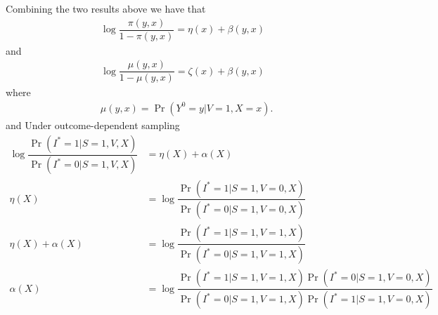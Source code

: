 \begin{appendix}
Combining the two results above we have that
\begin{align*}
    \log \dfrac{\pi(y, x)}{1 - \pi(y, x)} = \eta(x) + \beta(y, x)
\end{align*}
and 
\begin{align*}
    \log \dfrac{\mu(y, x)}{1 - \mu(y, x)} = \zeta(x) + \beta(y, x)
\end{align*}
where
\begin{align*}
    &\mu(y, x) = \Pr(Y^0 = y | V = 1, X = x). 
\end{align*}
and
Under outcome-dependent sampling 
\begin{align*}
    \log \dfrac{\Pr(I^* = 1 | S = 1, V, X)}{\Pr(I^* = 0 | S = 1, V, X)} &= \eta(X) + \alpha (X) \\
    \eta(X) &= \log \dfrac{\Pr(I^* = 1 | S = 1, V=0, X)}{\Pr(I^* = 0 | S = 1, V=0, X)} \\
    \eta(X) + \alpha(X) &= \log \dfrac{\Pr(I^* = 1 | S = 1, V=1, X)}{\Pr(I^* = 0 | S = 1, V=1, X)} \\
    \alpha(X) &= \log \dfrac{\Pr(I^* = 1 | S = 1, V=1, X)\Pr(I^* = 0 | S = 1, V=0, X)}{\Pr(I^* = 0 | S = 1, V=1, X)\Pr(I^* = 1 | S = 1, V=0, X)} \\
\end{align*}




\end{appendix}
